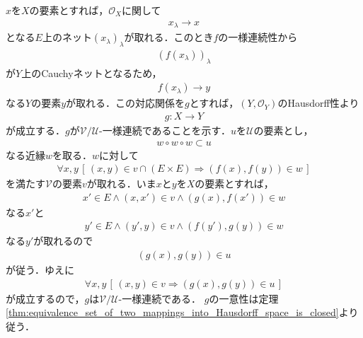 	\begin{sketch}
		$x$を$X$の要素とすれば，$\mathscr{O}_X$に関して
		\begin{align}
			x_\lambda \longrightarrow x
		\end{align}
		となる$E$上のネット$(x_\lambda)_\lambda$が取れる．このとき$f$の一様連続性から
		\begin{align}
			(f(x_\lambda))_\lambda
		\end{align}
		が$Y$上のCauchyネットとなるため，
		\begin{align}
			f(x_\lambda) \longrightarrow y
		\end{align}
		なる$Y$の要素$y$が取れる．この対応関係を$g$とすれば，$(Y,\mathscr{O}_Y)$のHausdorff性より
		\begin{align}
			g:X \longrightarrow Y
		\end{align}
		が成立する．$g$が$\mathscr{V}/\mathscr{U}$-一様連続であることを示す．$u$を$\mathscr{U}$の要素とし，
		\begin{align}
			w \circ w \circ w \subset u
		\end{align}
		なる近縁$w$を取る．$w$に対して
		\begin{align}
			\forall x,y\, \left[\, (x,y) \in v \cap (E \times E) \Longrightarrow (f(x),f(y)) \in w\, \right]
		\end{align}
		を満たす$\mathscr{V}$の要素$v$が取れる．いま$x$と$y$を$X$の要素とすれば，
		\begin{align}
			x' \in E \wedge (x,x') \in v \wedge (g(x),f(x')) \in w
		\end{align}
		なる$x'$と
		\begin{align}
			y' \in E \wedge (y',y) \in v \wedge (f(y'),g(y)) \in w
		\end{align}
		なる$y'$が取れるので
		\begin{align}
			(g(x),g(y)) \in u
		\end{align}
		が従う．ゆえに
		\begin{align}
			\forall x,y\, \left[\, (x,y) \in v \Longrightarrow (g(x),g(y)) \in u\, \right]
		\end{align}
		が成立するので，$g$は$\mathscr{V}/\mathscr{U}$-一様連続である．
		$g$の一意性は定理\ref{thm:equivalence_set_of_two_mappings_into_Hausdorff_space_is_closed}より従う．
		\QED
	\end{sketch}
	
